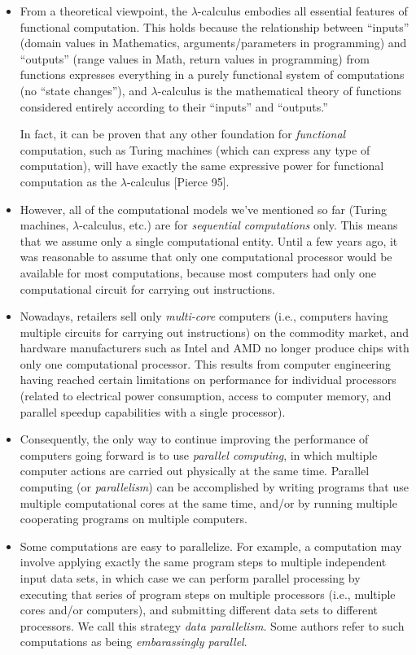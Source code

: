 \documentclass[letterpaper,10pt,openany,oneside]{sphinxmanual}
\begin{document}
\begin{itemize}
\item {} 
From a theoretical viewpoint, the $\lambda$-calculus embodies all essential features of functional computation. This holds because the relationship between ``inputs'' (domain values in Mathematics, arguments/parameters in programming) and ``outputs'' (range values in Math, return values in programming) from functions expresses everything in a purely functional system of computations (no ``state changes''), and $\lambda$-calculus is the mathematical theory of functions considered entirely according to their ``inputs'' and ``outputs.''

In fact, it can be proven that any other foundation for \emph{functional} computation, such as Turing machines (which can express any type of computation), will have exactly the same expressive power for functional computation as the $\lambda$-calculus {[}Pierce 95{]}.

\item {} 
However, all of the computational models we've mentioned so far (Turing machines, $\lambda$-calculus, etc.) are for \emph{sequential computations} only. This means that we assume only a single computational entity. Until a few years ago, it was reasonable to assume that only one computational processor would be available for most computations, because most computers had only one computational circuit for carrying out instructions.

\item {} 
Nowadays, retailers sell only \emph{multi-core} computers (i.e., computers having multiple circuits for carrying out instructions) on the commodity market, and hardware manufacturers such as Intel and AMD no longer produce chips with only one computational processor. This results from computer engineering having reached certain limitations on performance for individual processors (related to electrical power consumption, access to computer memory, and parallel speedup capabilities with a single processor).

\item {} 
Consequently, the only way to continue improving the performance of computers going forward is to use \emph{parallel computing}, in which multiple computer actions are carried out physically at the same time. Parallel computing (or \emph{parallelism}) can be accomplished by writing programs that use multiple computational cores at the same time, and/or by running multiple cooperating programs on multiple computers.

\item {} 
Some computations are easy to parallelize. For example, a computation may involve applying exactly the same program steps to multiple independent input data sets, in which case we can perform parallel processing by executing that series of program steps on multiple processors (i.e., multiple cores and/or computers), and submitting different data sets to different processors. We call this strategy \emph{data parallelism}. Some authors refer to such computations as being \emph{embarassingly parallel}.


\end{itemize}
\end{document}
